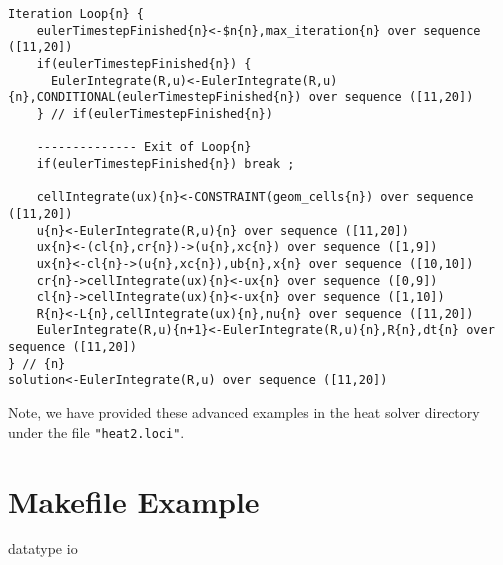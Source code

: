 \documentclass[10pt,epsf]{book}
\begin{document}
\begin{verbatim}
Iteration Loop{n} {
    eulerTimestepFinished{n}<-$n{n},max_iteration{n} over sequence ([11,20])
    if(eulerTimestepFinished{n}) {
      EulerIntegrate(R,u)<-EulerIntegrate(R,u){n},CONDITIONAL(eulerTimestepFinished{n}) over sequence ([11,20])
    } // if(eulerTimestepFinished{n})

    -------------- Exit of Loop{n}
    if(eulerTimestepFinished{n}) break ;

    cellIntegrate(ux){n}<-CONSTRAINT(geom_cells{n}) over sequence ([11,20])
    u{n}<-EulerIntegrate(R,u){n} over sequence ([11,20])
    ux{n}<-(cl{n},cr{n})->(u{n},xc{n}) over sequence ([1,9])
    ux{n}<-cl{n}->(u{n},xc{n}),ub{n},x{n} over sequence ([10,10])
    cr{n}->cellIntegrate(ux){n}<-ux{n} over sequence ([0,9])
    cl{n}->cellIntegrate(ux){n}<-ux{n} over sequence ([1,10])
    R{n}<-L{n},cellIntegrate(ux){n},nu{n} over sequence ([11,20])
    EulerIntegrate(R,u){n+1}<-EulerIntegrate(R,u){n},R{n},dt{n} over sequence ([11,20])
} // {n}
solution<-EulerIntegrate(R,u) over sequence ([11,20])
\end{verbatim}

Note, we have provided these advanced examples in the heat solver
directory under the file {\tt "heat2.loci"}.



\appendix

\chapter { Makefile Example}
\label{chap:makefile}



 {datatype}
 {io}


%
\end{document}
